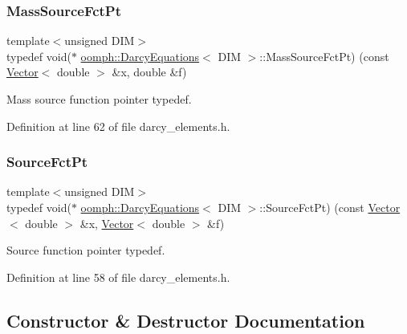 \subsubsection{\texorpdfstring{Mass\+Source\+Fct\+Pt}{MassSourceFctPt}}
{\footnotesize\ttfamily template$<$unsigned D\+IM$>$ \\
typedef void($\ast$ \hyperlink{classoomph_1_1DarcyEquations}{oomph\+::\+Darcy\+Equations}$<$ D\+IM $>$\+::Mass\+Source\+Fct\+Pt) (const \hyperlink{classoomph_1_1Vector}{Vector}$<$ double $>$ \&x, double \&f)}



Mass source function pointer typedef. 



Definition at line 62 of file darcy\+\_\+elements.\+h.

\mbox{\label{classoomph_1_1DarcyEquations_adcf88d9573b0f1c1988bdae6234eb7f8}} 
\subsubsection{\texorpdfstring{Source\+Fct\+Pt}{SourceFctPt}}
{\footnotesize\ttfamily template$<$unsigned D\+IM$>$ \\
typedef void($\ast$ \hyperlink{classoomph_1_1DarcyEquations}{oomph\+::\+Darcy\+Equations}$<$ D\+IM $>$\+::Source\+Fct\+Pt) (const \hyperlink{classoomph_1_1Vector}{Vector}$<$ double $>$ \&x, \hyperlink{classoomph_1_1Vector}{Vector}$<$ double $>$ \&f)}



Source function pointer typedef. 



Definition at line 58 of file darcy\+\_\+elements.\+h.



\subsection{Constructor \& Destructor Documentation}
\mbox{\label{classoomph_1_1DarcyEquations_a5b8e0269c593f216020e618b11bef912}} 
